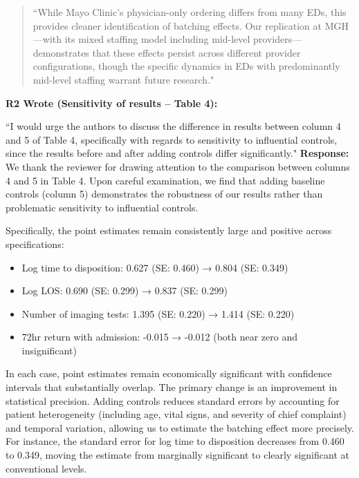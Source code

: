 \documentclass[11pt]{article}
\newenvironment{quote2}
{ \bigskip
\noindent
         \small\em
         \baselineskip=14pt
}
\newcommand{\1}{\hbox{\rm 1\kern-.35em 1}}
\begin{document}
{\begin{quote}
``While Mayo Clinic's physician-only ordering differs from many EDs, this provides cleaner identification of batching effects. Our replication at MGH—with its mixed staffing model including mid-level providers—demonstrates that these effects persist across different provider configurations, though the specific dynamics in EDs with predominantly mid-level staffing warrant future research."
\end{quote}
\color{black}


\begin{quote2}
\textbf{R2 Wrote (Sensitivity of results – Table 4):}  

\noindent``I would urge the authors to discuss the difference in results between column 4 and 5 of Table 4, specifically with regards to sensitivity to influential controls, since the results before and after adding controls differ significantly."
\end{quote2}

\noindent\textbf{Response:} \color{blue}We thank the reviewer for drawing attention to the comparison between columns 4 and 5 in Table 4. Upon careful examination, we find that adding baseline controls (column 5) demonstrates the robustness of our results rather than problematic sensitivity to influential controls.

Specifically, the point estimates remain consistently large and positive across specifications:
\begin{itemize}
    \item Log time to disposition: 0.627 (SE: 0.460) → 0.804 (SE: 0.349)
    \item Log LOS: 0.690 (SE: 0.299) → 0.837 (SE: 0.299)  
    \item Number of imaging tests: 1.395 (SE: 0.220) → 1.414 (SE: 0.220)
    \item 72hr return with admission: -0.015 → -0.012 (both near zero and insignificant)
\end{itemize}

In each case, point estimates remain economically significant with confidence intervals that substantially overlap. The primary change is an improvement in statistical precision. Adding controls reduces standard errors by accounting for patient heterogeneity (including age, vital signs, and severity of chief complaint) and temporal variation, allowing us to estimate the batching effect more precisely. For instance, the standard error for log time to disposition decreases from 0.460 to 0.349, moving the estimate from marginally significant to clearly significant at conventional levels.

}
\end{document}

